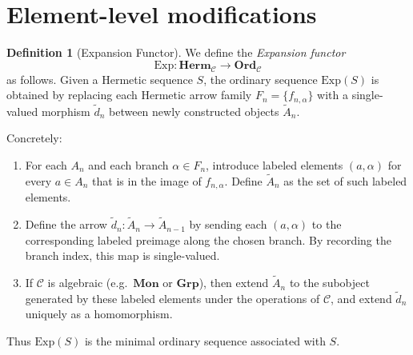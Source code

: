 \documentclass[11pt]{book}
\theoremstyle{definition}
\newtheorem{definition}{Definition}[section]
\theoremstyle{plain}
\theoremstyle{remark}
\begin{document}
\section{Element-level modifications} 
\begin{definition}[Expansion Functor]\label{def:expansion}
We define the \emph{Expansion functor}
\[
\mathrm{Exp}: \mathbf{Herm}_\mathcal{C} \longrightarrow \mathbf{Ord}_\mathcal{C}
\]
as follows.  
Given a Hermetic sequence $S$, the ordinary sequence $\mathrm{Exp}(S)$ is obtained by replacing each Hermetic arrow family $F_n=\{f_{n,\alpha}\}$ with a single-valued morphism $\tilde d_n$ between newly constructed objects $\tilde A_n$.  

Concretely:
\begin{enumerate}
    \item For each $A_n$ and each branch $\alpha \in F_n$, introduce labeled elements $(a,\alpha)$ for every $a\in A_n$ that is in the image of $f_{n,\alpha}$.  
    Define $\tilde A_n$ as the set of such labeled elements.
    \item Define the arrow $\tilde d_n:\tilde A_n \to \tilde A_{n-1}$ by sending each $(a,\alpha)$ to the corresponding labeled preimage along the chosen branch.  
    By recording the branch index, this map is single-valued.
    \item If $\mathcal{C}$ is algebraic (e.g.\ $\mathbf{Mon}$ or $\mathbf{Grp}$), then extend $\tilde A_n$ to the subobject generated by these labeled elements under the operations of $\mathcal{C}$, and extend $\tilde d_n$ uniquely as a homomorphism.
\end{enumerate}
Thus $\mathrm{Exp}(S)$ is the minimal ordinary sequence associated with $S$.
\end{definition}
\end{document}
